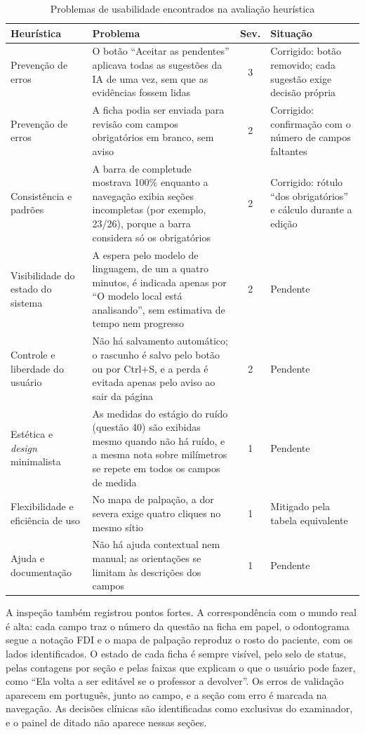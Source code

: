\begin{table}[htbp]
	\caption{Problemas de usabilidade encontrados na avaliação heurística}
	\label{tb:heuristica}
	\footnotesize
	\centering
	\begin{tabularx}{\textwidth}{L{2.9cm}YcL{3.4cm}}
		\hline
		\textbf{Heurística} & \textbf{Problema} & \textbf{Sev.} & \textbf{Situação} \\ \hline
		Prevenção de erros & O botão ``Aceitar as pendentes'' aplicava todas as sugestões da IA de uma vez, sem que as evidências fossem lidas & 3 & Corrigido: botão removido; cada sugestão exige decisão própria \\
		Prevenção de erros & A ficha podia ser enviada para revisão com campos obrigatórios em branco, sem aviso & 2 & Corrigido: confirmação com o número de campos faltantes \\
		Consistência e padrões & A barra de completude mostrava 100\% enquanto a navegação exibia seções incompletas (por exemplo, 23/26), porque a barra considera só os obrigatórios & 2 & Corrigido: rótulo ``dos obrigatórios'' e cálculo durante a edição \\
		Visibilidade do estado do sistema & A espera pelo modelo de linguagem, de um a quatro minutos, é indicada apenas por ``O modelo local está analisando'', sem estimativa de tempo nem progresso & 2 & Pendente \\
		Controle e liberdade do usuário & Não há salvamento automático; o rascunho é salvo pelo botão ou por Ctrl+S, e a perda é evitada apenas pelo aviso ao sair da página & 2 & Pendente \\
		Estética e \textit{design} minimalista & As medidas do estágio do ruído (questão 40) são exibidas mesmo quando não há ruído, e a mesma nota sobre milímetros se repete em todos os campos de medida & 1 & Pendente \\
		Flexibilidade e eficiência de uso & No mapa de palpação, a dor severa exige quatro cliques no mesmo sítio & 1 & Mitigado pela tabela equivalente \\
		Ajuda e documentação & Não há ajuda contextual nem manual; as orientações se limitam às descrições dos campos & 1 & Pendente \\ \hline
	\end{tabularx}
\end{table}

A inspeção também registrou pontos fortes. A correspondência com o mundo real é alta: cada campo traz o número da questão na ficha em papel, o odontograma segue a notação FDI e o mapa de palpação reproduz o rosto do paciente, com os lados identificados. O estado de cada ficha é sempre visível, pelo selo de status, pelas contagens por seção e pelas faixas que explicam o que o usuário pode fazer, como ``Ela volta a ser editável se o professor a devolver''. Os erros de validação aparecem em português, junto ao campo, e a seção com erro é marcada na navegação. As decisões clínicas são identificadas como exclusivas do examinador, e o painel de ditado não aparece nessas seções.

